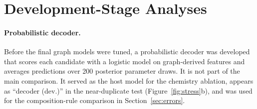 \documentclass[applsci,article,submit,oneauthor]{Definitions/mdpi}
\begin{document}


\appendixstart
\appendix
\section[\appendixname~\thesection]{Development-Stage Analyses}
\label{app:dev}

\paragraph{Probabilistic decoder.} Before the final graph models were tuned, a probabilistic decoder was developed that scores each candidate with a logistic model on graph-derived features and averages predictions over 200 posterior parameter draws. It is not part of the main comparison. It served as the host model for the chemistry ablation, appears as ``decoder (dev.)'' in the near-duplicate test (Figure~\ref{fig:stress}b), and was used for the composition-rule comparison in Section~\ref{sec:errors}.
\end{document}
